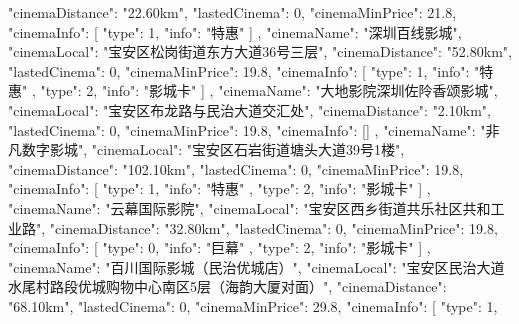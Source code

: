 {{{                "cinemaDistance": "22.60km",
                "lastedCinema": 0,
                "cinemaMinPrice": 21.8,
                "cinemaInfo": [
                    {
                        "type": 1,
                        "info": "特惠"
                    }
                ]
            },
            {
                "cinemaName": "深圳百线影城",
                "cinemaLocal": "宝安区松岗街道东方大道36号三层",
                "cinemaDistance": "52.80km",
                "lastedCinema": 0,
                "cinemaMinPrice": 19.8,
                "cinemaInfo": [
                    {
                        "type": 1,
                        "info": "特惠"
                    },
                    {
                        "type": 2,
                        "info": "影城卡"
                    }
                ]
            },
            {
                "cinemaName": "大地影院深圳佐阾香颂影城",
                "cinemaLocal": "宝安区布龙路与民治大道交汇处",
                "cinemaDistance": "2.10km",
                "lastedCinema": 0,
                "cinemaMinPrice": 19.8,
                "cinemaInfo": []
            },
            {
                "cinemaName": "非凡数字影城",
                "cinemaLocal": "宝安区石岩街道塘头大道39号1楼",
                "cinemaDistance": "102.10km",
                "lastedCinema": 0,
                "cinemaMinPrice": 19.8,
                "cinemaInfo": [
                    {
                        "type": 1,
                        "info": "特惠"
                    },
                    {
                        "type": 2,
                        "info": "影城卡"
                    }
                ]
            },
            {
                "cinemaName": "云幕国际影院",
                "cinemaLocal": "宝安区西乡街道共乐社区共和工业路",
                "cinemaDistance": "32.80km",
                "lastedCinema": 0,
                "cinemaMinPrice": 19.8,
                "cinemaInfo": [
                    {
                        "type": 0,
                        "info": "巨幕"
                    },
                    {
                        "type": 2,
                        "info": "影城卡"
                    }
                ]
            },
            {
                "cinemaName": "百川国际影城（民治优城店）",
                "cinemaLocal": "宝安区民治大道水尾村路段优城购物中心南区5层（海韵大厦对面）",
                "cinemaDistance": "68.10km",
                "lastedCinema": 0,
                "cinemaMinPrice": 29.8,
                "cinemaInfo": [
                    {
                        "type": 1,
}}}}
